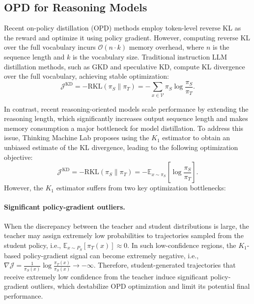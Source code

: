 \documentclass{llmxive}
\begin{document}
\subsection{OPD for Reasoning Models}





Recent on-policy distillation (OPD) methods employ token-level reverse KL as the reward and optimize it using policy gradient.
However, computing reverse KL over the full vocabulary incurs 
$\mathcal{O}(n \cdot k)$ memory overhead, where $n$ is the sequence length 
and $k$ is the vocabulary size. 
Traditional instruction LLM distillation methods, such as GKD and speculative KD, compute KL divergence over the full vocabulary, achieving stable optimization: 
\begin{equation}
\mathcal{J}^{\mathrm{KD}}
=
-\mathrm{RKL}(\pi_S \parallel \pi_T)
=
-\sum_{x \in \mathcal{V}}
\pi_S
\log \frac{\pi_S}{\pi_T}.
\end{equation}

In contrast, recent reasoning-oriented models scale performance by extending the reasoning length, which significantly increases output sequence length and makes memory consumption a major bottleneck for model distillation. To address this issue, Thinking Machine Lab proposes using the $K_1$ estimator to obtain an unbiased estimate of the KL divergence, leading to the following optimization objective:
\begin{equation}
\mathcal{J}^{\mathrm{KD}}
=
-\mathrm{RKL}(\pi_S \parallel \pi_T)
=
-\mathbb{E}_{x \sim \pi_S}
\left[
\log \frac{\pi_S}{\pi_T}
\right].
\end{equation}
However, the $K_1$ estimator suffers from two key optimization bottlenecks:

\paragraph{Significant policy-gradient outliers.}
When the discrepancy between the teacher and student distributions is large, the teacher may assign extremely low probabilities to trajectories sampled from the student policy, i.e., $\mathbb{E}_{x \sim P_S}\left[\pi_T(x)\right] \approx 0$. In such low-confidence regions, the $K_1$-based policy-gradient signal can become extremely negative, i.e., $\nabla \mathcal{J} = \frac{1}{\pi_S(x)} \log \frac{\pi_T(x)}{\pi_S(x)} \rightarrow -\infty$. Therefore, student-generated trajectories that receive extremely low confidence from the teacher induce significant policy-gradient outliers, which destabilize OPD optimization and limit its potential final performance.
\end{document}
